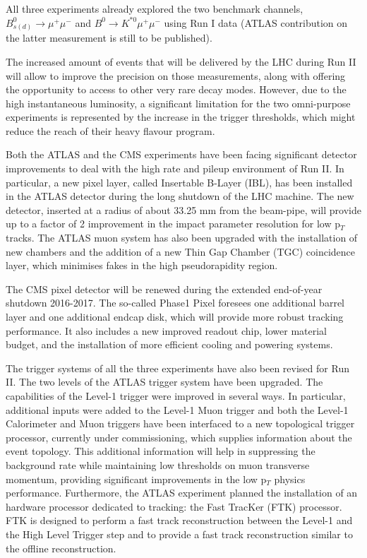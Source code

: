 All three experiments already explored the two benchmark channels, $B^0_{s(d)} \to \mu^+\mu^-$ and $B^0 \to K^{\ast 0}\mu^+\mu^-$ using Run I data (ATLAS contribution on the latter measurement is still to be published).

The increased amount of events that will be delivered by the LHC during Run II will allow to improve the precision on those measurements, along with offering the opportunity to access to other very rare decay modes.
However, due to the high instantaneous luminosity, a significant limitation for the two omni-purpose experiments is represented by the increase in the trigger thresholds, which might reduce the reach of their heavy flavour program.

Both the ATLAS and the CMS experiments have been facing significant detector improvements to deal with the high rate and pileup environment of Run II. 
In particular, a new pixel layer, called Insertable B-Layer (IBL), has been installed in the ATLAS detector during the long shutdown of the LHC machine. 
The new detector, inserted at a radius of about 33.25 mm from the beam-pipe, will provide up to a factor of 2 improvement in the impact parameter resolution for low p$_T$ tracks.
The ATLAS muon system has also been upgraded with the installation of new chambers and the addition of a new Thin Gap Chamber (TGC) coincidence layer, which minimises fakes in the high pseudorapidity region.

The CMS pixel detector will be renewed during the extended end-of-year shutdown 2016-2017. 
The so-called Phase1 Pixel foresees one additional barrel layer and one additional endcap disk, which will provide more robust tracking performance. 
It also includes a new improved readout chip, lower material budget, and the installation of more efficient cooling and powering systems.


The trigger systems of all the three experiments have also been revised for Run II.
The two levels of the ATLAS trigger system have been upgraded.
The capabilities of the Level-1 trigger were improved in several ways.
In particular, additional inputs were added to the Level-1 Muon trigger and both the Level-1 Calorimeter and Muon triggers have been interfaced to a new topological trigger processor, currently under commissioning, which supplies information about the event topology. 
This additional information will help in suppressing the background rate while maintaining low thresholds on muon transverse momentum, providing significant improvements in the low p$_T$ physics performance.
Furthermore, the ATLAS experiment planned the installation of an hardware processor dedicated to tracking: the Fast TracKer (FTK) processor. 
FTK is designed to perform a fast track reconstruction between the Level-1 and the High Level Trigger step and to provide a fast track reconstruction similar to the offline reconstruction.

